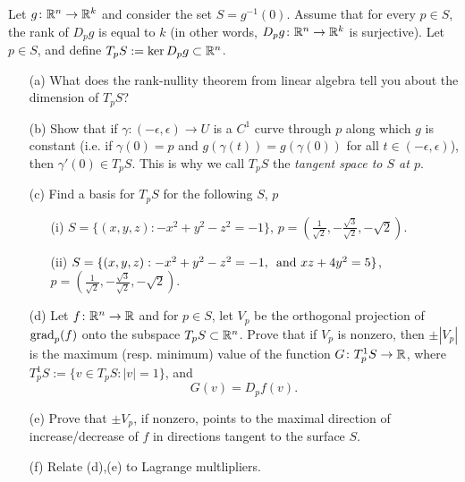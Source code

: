 \documentclass[a4paper, 12pt]{article}
\begin{document}
\begin{problem} 

Let $g\colon \mathbb{R}^n\to \mathbb{R}^k$ and consider the set $S=g^{-1}(0)$.  Assume that for every $p\in S$, the rank of $D_p g$ is equal to $k$ (in other words, $D_p g\colon \mathbb{R}^n\to \mathbb{R}^k$ is surjective).  Let $p\in S$, and define $T_pS:= \ker D_p g\subset \mathbb{R}^n$.

\begin{enumerate}
    \item[(a)] What does the rank-nullity theorem from linear algebra tell you about the dimension of $T_pS$?
    \item[(b)] Show that if $\gamma\colon (-\epsilon, \epsilon)\to U$ is a $C^1$ curve through $p$ along which $g$ is constant (i.e. if $\gamma(0)=p$ and $g(\gamma(t)) = g(\gamma(0))$ for all $t\in (-\epsilon,\epsilon)$), then   $\gamma'(0)\in T_pS$.  This is why we call $T_pS$ the {\em tangent space to $S$ at $p$}.
    \item[(c)] Find a basis for $T_pS$ for the following $S$, $p$
        \begin{itemize}
            \item[(i)] $S = \{(x,y,z) : -x^2 +y^2 - z^2 = -1\}$,  $p = (\frac{1}{\sqrt{2}}, - \frac{\sqrt{3}}{\sqrt{2}},  -\sqrt{2})$.
            \item[(ii)] $S = \{(x,y,z):  -x^2 +y^2 - z^2 = -1 ,\, \hbox{ and }  xz + 4y^2 = 5 \}$, $p=  (\frac{1}{\sqrt{2}}, - \frac{\sqrt{3}}{\sqrt{2}},  -\sqrt{2})$.
        \end{itemize}
    \item[(d)]  Let $f\colon \mathbb{R}^n\to \mathbb{R}$ and for $p\in S$,  let $V_p$ be the orthogonal projection of $\hbox{grad}_p(f)$ onto the subspace $T_p S\subset \mathbb{R}^n$.  Prove that if $V_p$ is nonzero, then $\pm|V_p|$ is the maximum (resp. minimum) value of the function $G\colon T_p^1S\to \mathbb{R}$, where $T_p^1S :=\{v\in T_pS: |v|=1\}$, and
        \[G(v) = D_pf (v).
        \]
    \item[(e)] Prove that $\pm V_p$, if nonzero,  points to the maximal direction of increase/decrease of $f$ in directions tangent to the surface $S$.
    \item[(f)] Relate (d),(e) to Lagrange multlipliers.
\end{enumerate}
\end{problem}
\end{document}
